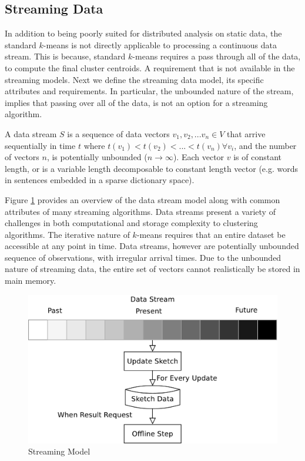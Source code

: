 \subsection{Streaming Data}
In addition to being poorly suited for distributed analysis on static data, the standard $k$-means is not 
directly applicable to processing a continuous data stream. This is because, standard $k$-means requires a
pass through all of the data, to compute the final cluster centroids.  A requirement that is not available
in the streaming models. Next we define the streaming data model, its specific attributes and requirements.
In particular, the unbounded nature of the stream, implies that passing over all of the data, is not an option
for a streaming algorithm.
\begin{Definition}
A data stream $S$ is a sequence of data vectors $v_1,v_2,...v_n \in V $ that arrive sequentially in time $t$ where
$t(v_1) < t(v_2) < ... < t(v_n) \forall v_i$, and the number of vectors $n$, is potentially 
unbounded ($n\rightarrow \infty$).  Each vector $v$ is of constant length, or is a variable length decomposable to 
constant length vector (e.g. words in sentences embedded in a sparse dictionary space).
\end{Definition}

Figure \ref{strmodel} provides an overview of the data stream model along with common attributes of many streaming
algorithms.  Data streams present a variety of challenges in both computational and storage complexity to clustering
algorithms.  The iterative nature of $k$-means requires that an entire dataset be accessible at any point in time.  Data
streams, however are potentially unbounded sequence of observations, with irregular arrival times.  Due to the unbounded
nature of streaming data, the entire set of vectors cannot realistically be stored in main memory.

\begin{figure}
    \centerline{\includegraphics[width=.8\textwidth]{figs/Streaming}}
    \caption{Streaming Model}\label{strmodel}
\end{figure}

